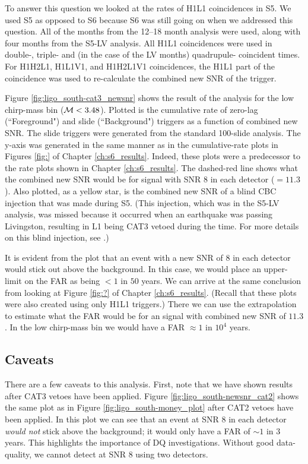 To answer this question we looked at the rates of H1L1 coincidences in \ac{S5}. We used \ac{S5} as opposed to \ac{S6} because \ac{S6} was still going on when we addressed this question. All of the months from the 12--18 month analysis were used, along with four months from the \ac{S5}-LV analysis. All H1L1 coincidences were used in double-, triple- and (in the case of the LV months) quadrupule- coincident times. For H1H2L1, H1L1V1, and H1H2L1V1 coincidences, the H1L1 part of the coincidence was used to re-calculate the combined new \ac{SNR} of the trigger.

Figure \ref{fig:ligo_south-cat3_newsnr} shows the result of the analysis for the low chirp-mass bin ($\mathcal{M} < 3.48$). Plotted is the cumulative rate of zero-lag (``Foreground") and slide (``Background") triggers as a function of combined new \ac{SNR}. The slide triggers were generated from the standard 100-slide \ihope analysis. The y-axis was generated in the same manner as in the cumulative-rate plots in Figures \ref{fig:} of Chapter \ref{ch:s6_results}. Indeed, these plots were a predecessor to the rate plots shown in Chapter \ref{ch:s6_results}. The dashed-red line shows what the combined new \ac{SNR} would be for signal with \ac{SNR} $8$ in each detector ($= 11.3$). Also plotted, as a yellow star, is the combined new \ac{SNR} of a blind \ac{CBC} injection that was made during \ac{S5}. (This injection, which was in the \ac{S5}-LV analysis, was missed because it occurred when an earthquake was passing Livingston, resulting in L1 being CAT3 vetoed during the time. For more details on this blind injection, see \cite{ref:s5LV}.)

It is evident from the plot that an event with a new \ac{SNR} of $8$ in each detector would stick out above the background. In this case, we would place an upper-limit on the \ac{FAR} as being $< 1$ in $50$ years. We can arrive at the same conclusion from looking at Figure \ref{fig:?} of Chapter \ref{ch:s6_results}. (Recall that these plots were also created using only H1L1 triggers.) There we can use the extrapolation to estimate what the \ac{FAR} would be for an signal with combined new \ac{SNR} of $11.3$. In the low chirp-mass bin we would have a \ac{FAR} $\approx 1$ in $10^4$ years. 

\subsection{Caveats}

There are a few caveats to this analysis. First, note that we have shown results after CAT3 vetoes have been applied. Figure \ref{fig:ligo_south-newsnr_cat2} shows the same plot as in Figure \ref{fig:ligo_south-money_plot} after CAT2 vetoes have been applied. In this plot we can see that an event at \ac{SNR} $8$ in each detector \emph{would not} stick above the background; it would only have a \ac{FAR} of $\sim1$ in $3$ years. This highlights the importance of \ac{DQ} investigations. Without good data-quality, we cannot detect at \ac{SNR} $8$ using two detectors.

